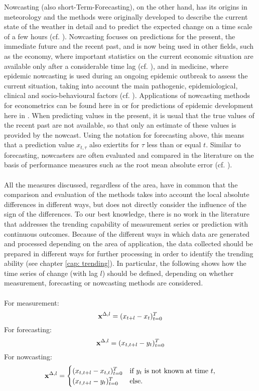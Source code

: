 Nowcasting (also short-Term-Forecasting), on the other hand, has its origins in meteorology and the methods were originally developed to describe the current state of the weather in detail and to predict the expected change on a time scale of a few hours (cf. \cite{browning1989nowcasting,schmid2019nowcasting}). Nowcasting focuses on predictions for the present, the immediate future and the recent past, and is now being used in other fields, such as the economy, where important statistics on the current economic situation are available only after a considerable time lag (cf. \cite{banbura2013now}), and in medicine, where epidemic nowcasting is used during an ongoing epidemic outbreak to assess the current situation, taking into account the main pathogenic, epidemiological, clinical and socio-behavioural factors (cf. \cite{wu2021nowcasting}). Applications of nowcasting methods for econometrics can be found here in \cite{giannone2006nowcasting,fornaro2020nowcasting,bok2018macroeconomic} or for predictions of epidemic development here in \cite{johansson2014nowcasting,gunther2021nowcasting,birrell2021real}. When predicting values in the present, it is usual that the true values of the recent past are not available, so that only an estimate of these values is provided by the nowcast. Using the notation for forecasting above, this means that a prediction value $x_{t,\tau}$ also exiertits for $\tau$ less than or equal $t$. Similar to forecasting, nowcasters are often evaluated and  compared in the literature on the basis of performance measures such as the root mean absolute error (cf. \cite{gunther2021nowcasting}).\\\\
All the measures discussed, regardless of the area, have in common that the comparison and evaluation of the methods takes into account the local absolute differences in different ways, but does not directly consider the influence of the sign of the differences. To our best knowledge, there is no work in the literature that addresses the trending capability of measurement series or prediction with continuous outcomes. Because of the different ways in which data are generated and processed depending on the area of application, the data collected should be prepared in different ways for further processing in order to identify the trending ability (see chapter \ref{cap: trending}). In particular, the following shows how the time series of change (with lag $l$) should be defined, depending on whether measurement, forecasting or nowcasting methods are considered.\\\\
For measurement:
\[\mathbf{x}^{\Delta,l} = (x_{t+l} -x_{t})^T_{t=0}  \]
For forecasting: 
\[\mathbf{x}^{\Delta,l} = (x_{t,t+l} -y_{t})^T_{t=0}  \]
For nowcasting:
\[
\mathbf{x}^{\Delta,l} = 
\begin{cases} 
(x_{t,t+l} -x_{t,t})^T_{t=0} & \text{if } y_{t} \text{ is not known at time } t, \\
(x_{t,t+l} -y_{t})^T_{t=0}  & \text{else}.
\end{cases}
    \]

